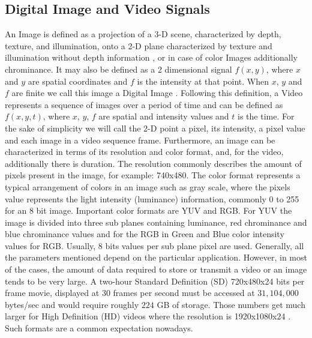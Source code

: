\documentclass[a4paper,11pt,oneside]{article}
\begin{document}
\subsection{Digital Image and Video Signals}
\indent An Image is defined as a projection of a 3-D scene, characterized by depth, texture, and illumination, onto a 2-D plane characterized by texture and illumination without depth information \cite[pp.~5]{richardson2002video}, or in case of color Images additionally chrominance. It may also be defined as a 2 dimensional signal $ f(x, y) $, where $x$ and $y$ are spatial coordinates and $f$ is the intensity at that point. When $x$, $y$ and $f$ are finite we call this image a Digital Image \cite[ppp.~1]{gonzalez2008digital}. 
Following this definition, a Video represents a sequence of images over a period of time and can be defined as $f(x,y,t)$, where $x$, $y$, $f$ are spatial and intensity values and $t$ is the time.
For the sake of simplicity we will call the 2-D point a pixel, its intensity, a pixel value and each image in a video sequence frame.
Furthermore, an image can be characterized in terms of its resolution and color format, and, for the video, additionally there is duration. The resolution commonly describes the amount of pixels present in the image, for example: 740x480. The color format represents a typical arrangement of colors in an image such as gray scale, where the pixels value represents the light intensity (luminance) information, commonly 0 to 255 for an 8 bit image. Important color formats are YUV and RGB. For YUV the image is divided into three sub planes containing luminance, red chrominance and blue chrominance values and for the RGB in Green and Blue color intensity values for RGB. Usually, 8 bits values per sub plane pixel are used. Generally, all the parameters mentioned depend on the particular application. However, in most of the cases, the amount of data required to store or transmit a video or an image tends to be very large. A two-hour Standard Definition (SD) 720x480x24 bits per frame movie, displayed at 30 frames per second must be accessed at $ 31,104,000 $ bytes/sec and would require roughly $224$ GB of storage. Those numbers get much larger for High Definition (HD) videos where the resolution is 1920x1080x24 \cite[pp.~525-526]{gonzalez2008digital}. Such formats are a common expectation nowadays. \\
\end{document}
